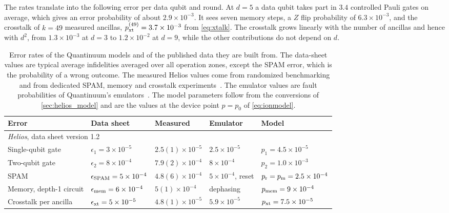 The rates translate into the following error per data qubit and round. At $d=5$ a data qubit takes part in $3.4$ controlled Pauli gates on average, which gives an error probability of about $2.9\times10^{-3}$. It sees seven memory steps, a $Z$ flip probability of $6.3\times10^{-3}$, and the crosstalk of $k=49$ measured ancillas, $p_{\rm xt}^{(49)}=3.7\times10^{-3}$ from \autoref{eq:xtalk}. The crosstalk grows linearly with the number of ancillas and hence with $d^2$, from $1.3\times10^{-3}$ at $d=3$ to $1.2\times10^{-2}$ at $d=9$, while the other contributions do not depend on $d$.

\begin{table}[t]
  \caption{Error rates of the Quantinuum models and of the published data they are built from. The data-sheet values are typical average infidelities averaged over all operation zones, except the SPAM error, which is the probability of a wrong outcome. The measured Helios values come from randomized benchmarking and from dedicated SPAM, memory and crosstalk experiments~\cite{ransford2026}. The emulator values are fault probabilities of Quantinuum's emulators~\cite{quantinuum_emulator}. The model parameters follow from the conversions of \autoref{sec:helios_model} and are the values at the device point $p=p_0$ of \autoref{eq:ionmodel}.}
  \label{tab:qparams}
  \begin{ruledtabular}
  \setlength{\tabcolsep}{5pt}
  \begin{tabular}{lllll}
    Error & Data sheet & Measured & Emulator & Model \\
    \hline
    \multicolumn{5}{l}{\emph{Helios}, data sheet version 1.2~\cite{helios_datasheet}} \\
    Single-qubit gate & $\epsilon_1=3\times10^{-5}$ & $2.5(1)\times10^{-5}$ & $2.5\times10^{-5}$ & $p_1=4.5\times10^{-5}$ \\
    Two-qubit gate & $\epsilon_2=8\times10^{-4}$ & $7.9(2)\times10^{-4}$ & $8\times10^{-4}$ & $p_2=1.0\times10^{-3}$ \\
    SPAM & $\epsilon_{\rm SPAM}=5\times10^{-4}$ & $4.8(6)\times10^{-4}$ & $5\times10^{-4}$, reset & $p_{\rm r}=p_{\rm m}=2.5\times10^{-4}$ \\
    Memory, depth-1 circuit & $\epsilon_{\rm mem}=6\times10^{-4}$ & $5(1)\times10^{-4}$ & dephasing & $p_{\rm mem}=9\times10^{-4}$ \\
    Crosstalk per ancilla & $\epsilon_{\rm xt}=5\times10^{-5}$ & $4.8(1)\times10^{-5}$ & $5.9\times10^{-5}$ & $p_{\rm xt}=7.5\times10^{-5}$ \\

\end{tabular}
\end{ruledtabular}
\end{table}
